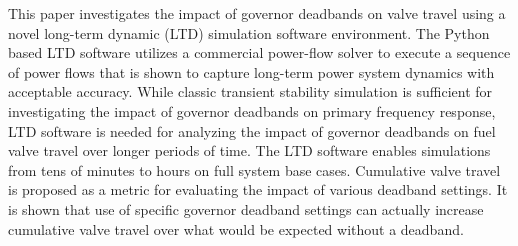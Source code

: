 %
This paper investigates the impact of governor deadbands on valve travel using a novel long-term dynamic (LTD) simulation software environment. 
The Python based LTD software utilizes a commercial power-flow solver to execute a sequence of power flows that is shown to capture long-term power system dynamics with acceptable accuracy.
While classic transient stability simulation is sufficient for investigating the impact of governor deadbands on primary frequency response, LTD software is needed for analyzing the impact of governor deadbands on fuel valve travel over longer periods of time. 
The LTD software enables simulations from tens of minutes to hours on full system base cases. %
Cumulative valve travel is proposed as a metric for evaluating the impact of various deadband settings.
It is shown that use of specific governor deadband settings can actually increase cumulative valve travel over what would be expected without a deadband.